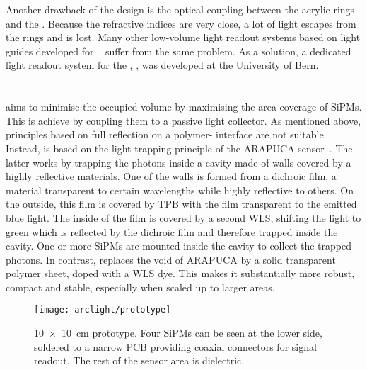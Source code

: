 Another drawback of the design is the optical coupling between the acrylic rings and the \lar{}.
Because the refractive indices are very close, a lot of light escapes from the rings and is lost.
Many other low-volume light readout systems based on light guides developed for \lar{}~\cite{lar_lro1, lar_lro2, lar_lro3, lar_lro4, lar_lro5, lar_lro6, lar_lro7} suffer from the same problem.
As a solution, a dedicated light readout system for the \AC{}, \AL{}, was developed at the University of Bern.

\afterpage{\clearpage}


\section{\AL{}}
\label{sec:light-ro_arclight}

\AL{} aims to minimise the occupied volume by maximising the area coverage of SiPMs.
This is achieve by coupling them to a passive light collector.
As mentioned above, principles based on full reflection on a polymer-\lar{} interface are not suitable.
Instead, \AL{} is based on the light trapping principle of the ARAPUCA sensor~\cite{arapuca}.
The latter works by trapping the photons inside a cavity made of walls covered by a highly reflective materials.
One of the walls is formed from a dichroic film, a material transparent to certain wavelengths while highly reflective to others.
On the outside, this film is covered by TPB with the film transparent to the emitted blue light.
The inside of the film is covered by a second WLS, shifting the light to green which is reflected by the dichroic film and therefore trapped inside the cavity.
One or more SiPMs are mounted inside the cavity to collect the trapped photons.
In contrast, \AL{} replaces the void of ARAPUCA by a solid transparent polymer sheet, doped with a WLS dye.
This makes it substantially more robust, compact and stable, especially when scaled up to larger areas.

\begin{figure}[htb]
	\centering
	\texttt{[image: arclight/prototype]}
	\caption{\SI{10 x 10}{\centi\metre} \AL{} prototype.
		Four SiPMs can be seen at the lower side, soldered to a narrow PCB providing coaxial connectors for signal readout.
		The rest of the sensor area is dielectric.}
	\label{fig:arclight_prototype}
\end{figure}

